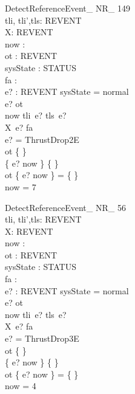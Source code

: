 \begin{schema}{DetectReferenceEvent\_ NR\_ 149}\\
tli, tli',tls: REVENT \fun \nat \\
X: REVENT \fun \nat \\
 now : \nat \\
 ot : REVENT \pfun \nat \\
 sysState : STATUS \\
 fa : \nat \\
 e? : REVENT 
\where
 sysState = normal \\
 e? \notin \dom ot \\
 now \in tli~e? \upto tls~e? \\
 X~e? \geq fa \\
 e? = ThrustDrop2E \\
 ot \neq \{ \} \\
 \{ e? \mapsto now \} \neq \{ \} \\
 ot \cap \{ e? \mapsto now \} = \{ \} \\
 now = 7
\end{schema}

\begin{schema}{DetectReferenceEvent\_ NR\_ 56}\\
tli, tli',tls: REVENT \fun \nat \\
X: REVENT \fun \nat \\
 now : \nat \\
 ot : REVENT \pfun \nat \\
 sysState : STATUS \\
 fa : \nat \\
 e? : REVENT 
\where
 sysState = normal \\
 e? \notin \dom ot \\
 now \in tli~e? \upto tls~e? \\
 X~e? \geq fa \\
 e? = ThrustDrop3E \\
 ot \neq \{ \} \\
 \{ e? \mapsto now \} \neq \{ \} \\
 ot \cap \{ e? \mapsto now \} = \{ \} \\
 now = 4
\end{schema}


